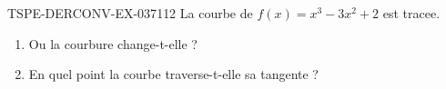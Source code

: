 \begin{exercice}{TSPE-DERCONV-EX-037}{1}{12}
La courbe de $f(x) = x^3 - 3x^2 + 2$ est tracee.
\begin{enumerate}
  \item Ou la courbure change-t-elle ?
  \item En quel point la courbe traverse-t-elle sa tangente ?
\end{enumerate}

\end{exercice}
